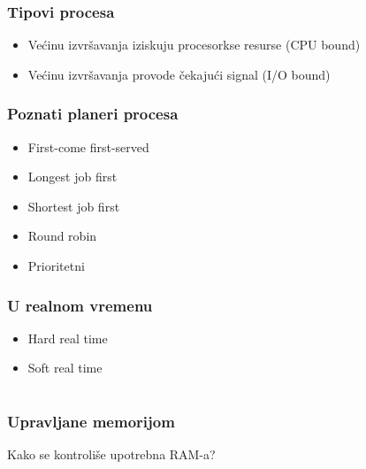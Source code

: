 \documentclass{beamer}
\begin{document}
\begin{frame}
    \frametitle{Tipovi procesa}
    \begin{itemize}
        \item Većinu izvršavanja iziskuju procesorkse resurse (CPU bound) \newline
        \item Većinu izvršavanja provode čekajući signal (I/O bound)
    \end{itemize}
\end{frame}

\begin{frame}
    \frametitle{Poznati planeri procesa}
    \begin{itemize}
        \item First-come first-served \newline
        \item Longest job first \newline
        \item Shortest job first \newline
        \item Round robin \newline
        \item Prioritetni
    \end{itemize}
\end{frame}

\begin{frame}
    \frametitle{U realnom vremenu}
    \begin{itemize}
        \item Hard real time \newline
        \item Soft real time
    \end{itemize}
\end{frame}

\section*{}
\subsection*{}
\begin{frame}
    \frametitle{Upravljane memorijom}
    \begin{center}
        Kako se kontroliše upotrebna RAM-a?
    \end{center}
\end{frame}
\end{document}
